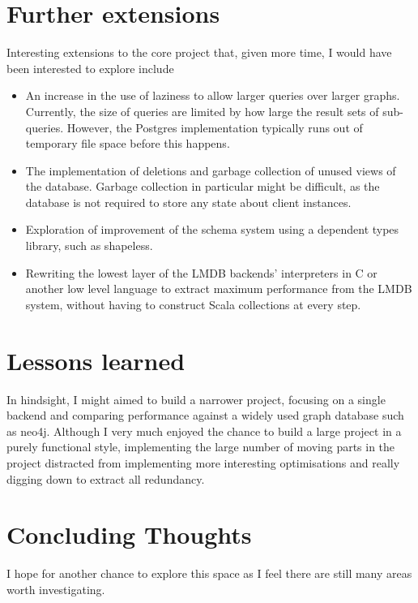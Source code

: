 \documentclass[12pt,a4paper,twoside,openright]{report}
\begin{document}
{{\section{Further extensions}
Interesting extensions to the core project that, given more time, I would have been interested to explore include
\begin{itemize}
 \item An increase in the use of laziness to allow larger queries over larger graphs. Currently, the size of queries are limited by how large the result sets of sub-queries. However, the Postgres implementation typically runs out of temporary file space before this happens.
 \item The implementation of deletions and garbage collection of unused views of the database. Garbage collection in particular might be difficult, as the database is not required to store any state about client instances.
 \item Exploration of  improvement of the schema system using a dependent types library, such as shapeless.
 \item Rewriting the lowest layer of the LMDB backends' interpreters in C or another low level language to extract maximum performance from the LMDB system, without having to construct Scala collections at every step.
\end{itemize}

\section{Lessons learned}
	In hindsight, I might aimed to build a narrower project, focusing on a single backend and comparing  performance against a widely used graph database such as neo4j. Although I very much enjoyed the chance to build a large project in a purely functional style, implementing the large number of moving parts in the project distracted from implementing more interesting optimisations and really digging down to extract all redundancy.

\section{Concluding Thoughts}
I hope for another chance to explore this space as I feel there are still many areas worth investigating.






}}
\end{document}
